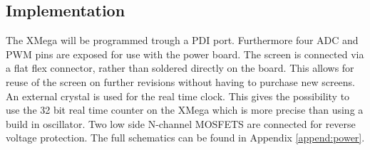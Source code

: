 \subsection{Implementation}
The XMega will be programmed trough a PDI port. Furthermore four ADC and PWM pins are exposed for use with the power board. The screen is connected via a flat flex connector, rather than soldered directly on the board. This allows for reuse of the screen on further revisions without having to purchase new screens.\newpar
An external crystal is used for the real time clock. This gives the possibility to use the 32 bit real time counter on the XMega which is more precise than using a build in oscillator. Two low side N-channel MOSFETS are connected for reverse voltage protection. \newpar
The full schematics can be found in Appendix \ref{append:power}.